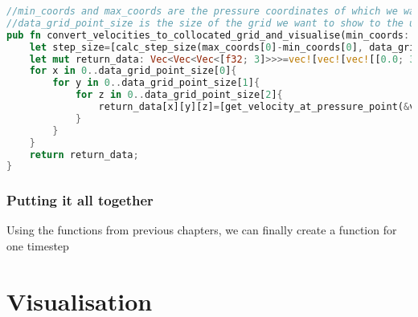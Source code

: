 \documentclass{article}
\begin{document}
\begin{lstlisting}[language=Rust, style=boxed, breaklines=true]
//min_coords and max_coords are the pressure coordinates of which we want to know the velocities(this function will determine those velocities by taking the average of nearby velocities)
//data_grid_point_size is the size of the grid we want to show to the user
pub fn convert_velocities_to_collocated_grid_and_visualise(min_coords: [usize; 3], max_coords: [usize;3], data_grid_point_size: [usize; 3], velocity_grid_x: &VelocityGrid, velocity_grid_y: &VelocityGrid, velocity_grid_z: &VelocityGrid) -> Vec<Vec<Vec<[f32;3]>>>{
    let step_size=[calc_step_size(max_coords[0]-min_coords[0], data_grid_point_size[0]), calc_step_size(max_coords[1]-min_coords[1], data_grid_point_size[1]), calc_step_size(max_coords[2]-min_coords[2], data_grid_point_size[2])];
    let mut return_data: Vec<Vec<Vec<[f32; 3]>>>=vec![vec![vec![[0.0; 3]; data_grid_point_size[0]]; data_grid_point_size[1]]; data_grid_point_size[0]];
    for x in 0..data_grid_point_size[0]{
        for y in 0..data_grid_point_size[1]{
            for z in 0..data_grid_point_size[2]{
                return_data[x][y][z]=[get_velocity_at_pressure_point(&velocity_grid_x, x*step_size[0], y*step_size[1], z*step_size[2]),  get_velocity_at_pressure_point(&velocity_grid_y, x*step_size[0], y*step_size[1], z*step_size[2]), get_velocity_at_pressure_point(&velocity_grid_z, x*step_size[0], y*step_size[1], z*step_size[2])];
            }
        }
    }
    return return_data;
}
\end{lstlisting}

\subsubsection{Putting it all together}
Using the functions from previous chapters, we can finally create a function for one timestep





\newpage  
\section{Visualisation}
\end{document}
